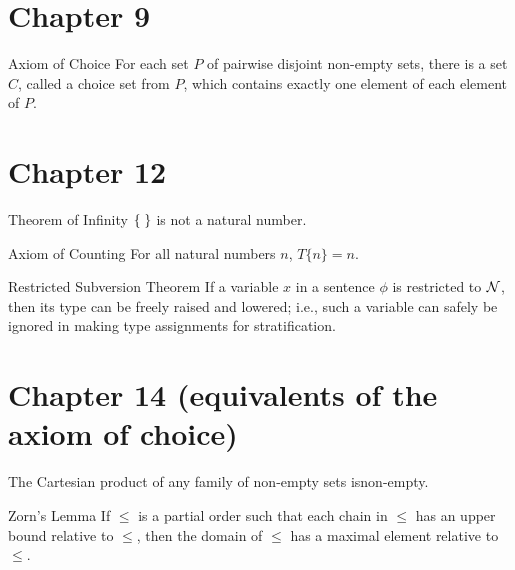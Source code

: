 \section *{Chapter 9}

\begin{axiom}{Axiom of Choice%
}
 For each set $P$ of pairwise disjoint non-empty
 sets, there is a set $C$, called a {\upshape choice set} from $P$, which
 contains exactly one element of each element of $P$.
\end{axiom}




\section *{Chapter 12}

\begin{Thm}{Theorem of Infinity}
 $\mbox{$\{\;\}$}$ is not a natural number.
\end{Thm}

\begin{axiom}{Axiom of Counting}
 For all natural numbers $n$, $T\{n\} = 
 n$. 
\end{axiom}

\begin{Thm}{Restricted Subversion Theorem}
 If a variable $x$ in a sentence $\phi$ is restricted to $\cal N$, then its
 type can be freely raised and lowered; i.e., such a
 variable can safely be ignored in making type assignments for
 stratification.
\end{Thm}



\section *{Chapter 14 (equivalents of the axiom of choice)}

\begin{thm}
 The Cartesian product of any family of non-empty sets
 is\linebreak non-empty.
\end{thm}

\begin{Thm}{Zorn's Lemma}
 If $\leq$ is a partial order such that each chain in
 $\leq$ has an upper bound relative to $\leq$, then the
 domain of $\leq$ has a maximal element relative to $\leq$.
\end{Thm}

